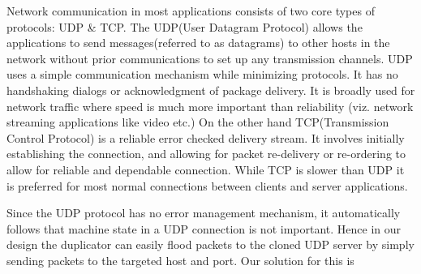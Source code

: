 Network communication in most applications consists of two core types of protocols: UDP \& TCP.
The UDP(User Datagram Protocol) allows the applications to send messages(referred to as datagrams) to other hosts in the network without prior communications to set up any transmission channels.
UDP uses a simple communication mechanism while minimizing protocols. 
It has no handshaking dialogs or acknowledgment of package delivery. It is broadly used for network traffic where speed is much more important than reliability (viz. network streaming applications like video etc.)
On the other hand TCP(Transmission Control Protocol) is a reliable error checked delivery stream.
It involves initially establishing the connection, and allowing for packet re-delivery or re-ordering to allow for reliable and dependable connection. 
While TCP is slower than UDP it is preferred for most normal connections between clients and server applications.

Since the UDP protocol has no error management mechanism, it automatically follows that machine state in a UDP connection is not important.
Hence in our design the duplicator can easily flood packets to the cloned UDP server by simply sending packets to the targeted host and port. 
Our solution for this is 

\fi

